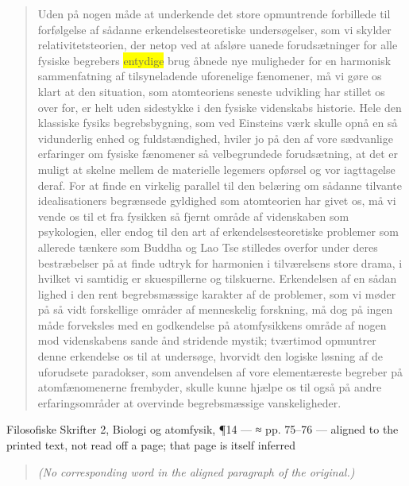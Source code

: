 \documentclass[11pt]{article}
\newcommand{\dcite}[1]{{\nopagebreak\raggedleft\small #1\par}\medskip}
\newcommand{\tlg}[1]{{\setlength{\fboxsep}{0.8pt}\colorbox{yellow}{#1}}}
\begin{document}
\begin{quote}
Uden på nogen måde at underkende det store opmuntrende forbillede til forfølgelse af sådanne erkendelsesteoretiske undersøgelser, som vi skylder relativitetsteorien, der netop ved at afsløre uanede forudsætninger for alle fysiske begrebers \tlg{entydige} brug åbnede nye muligheder for en harmonisk sammenfatning af tilsyneladende uforenelige fænomener, må vi gøre os klart at den situation, som atomteoriens seneste udvikling har stillet os over for, er helt uden sidestykke i den fysiske videnskabs historie. Hele den klassiske fysiks begrebsbygning, som ved Einsteins værk skulle opnå en så vidunderlig enhed og fuldstændighed, hviler jo på den af vore sædvanlige erfaringer om fysiske fænomener så velbegrundede forudsætning, at det er muligt at skelne mellem de materielle legemers opførsel og vor iagttagelse deraf. For at finde en virkelig parallel til den belæring om sådanne tilvante idealisationers begrænsede gyldighed som atomteorien har givet os, må vi vende os til et fra fysikken så fjernt område af videnskaben som psykologien, eller endog til den art af erkendelsesteoretiske problemer som allerede tænkere som Buddha og Lao Tse stilledes overfor under deres bestræbelser på at finde udtryk for harmonien i tilværelsens store drama, i hvilket vi samtidig er skuespillerne og tilskuerne. Erkendelsen af en sådan lighed i den rent begrebsmæssige karakter af de problemer, som vi møder på så vidt forskellige områder af menneskelig forskning, må dog på ingen måde forveksles med en godkendelse på atomfysikkens område af nogen mod videnskabens sande ånd stridende mystik; tværtimod opmuntrer denne erkendelse os til at undersøge, hvorvidt den logiske løsning af de uforudsete paradokser, som anvendelsen af vore elementæreste begreber på atomfænomenerne frembyder, skulle kunne hjælpe os til også på andre erfaringsområder at overvinde begrebsmæssige vanskeligheder.
\end{quote}
\dcite{Filosofiske Skrifter 2, Biologi og atomfysik, ¶14 — ≈ pp. 75–76 — aligned to the printed text, not read off a page; that page is itself inferred}
{\footnotesize\begin{quote}\itshape (No corresponding word in the aligned paragraph of the original.)\end{quote}}
\end{document}
